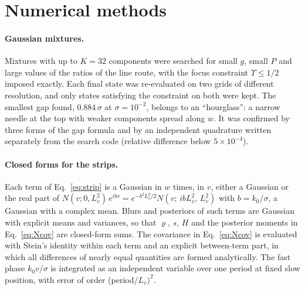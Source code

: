 \section{Numerical methods}
\label{app:methods}

\paragraph*{Gaussian mixtures.} Mixtures with up to $K = 32$ components were searched for small $g$, small $P$ and large values of the ratios of the line route, with the focus constraint $\Upsilon \leq 1/2$ imposed exactly. Each final state was re-evaluated on two grids of different resolution, and only states satisfying the constraint on both were kept. The smallest gap found, $0.884\,\sigma$ at $\sigma = 10^{-2}$, belongs to an ``hourglass'': a narrow needle at the top with weaker components spread along $w$. It was confirmed by three forms of the gap formula and by an independent quadrature written separately from the search code (relative difference below $5\times 10^{-4}$).

\paragraph*{Closed forms for the strips.} Each term of Eq.~\eqref{eq:strip} is a Gaussian in $w$ times, in $v$, either a Gaussian or the real part of $N(v;0,L_v^2)\,e^{ibv} = e^{-b^2L_v^2/2}N(v;\,ibL_v^2,\,L_v^2)$ with $b = k_0/\sigma$, a Gaussian with a complex mean. Blurs and posteriors of such terms are Gaussian with explicit means and variances, so that $\varrho$, $s$, $H$ and the posterior moments in Eq.~\eqref{eq:Ncov} are closed-form sums. The covariance in Eq.~\eqref{eq:Ncov} is evaluated with Stein's identity within each term and an explicit between-term part, in which all differences of nearly equal quantities are formed analytically. The fast phase $k_0 v/\sigma$ is integrated as an independent variable over one period at fixed slow position, with error of order (period$/L_v)^2$.

